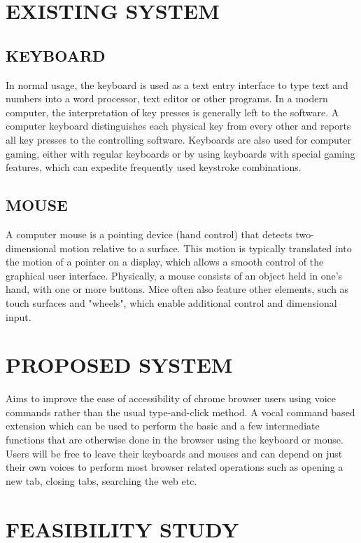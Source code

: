 \documentclass[12pt]{report} %
\begin{document}
\section{EXISTING SYSTEM}
\label{sec:EXISTING SYSTEM}

\subsection{KEYBOARD}
\label{subsec:KEYBOARD} 
In normal usage, the keyboard is used as a text entry interface to type text and numbers into a word processor, text editor or other programs. In a modern computer, the interpretation of key presses is generally left to the software. A computer keyboard distinguishes each physical key from every other and reports all key presses to the controlling software. Keyboards are also used for computer gaming, either with regular keyboards or by using keyboards with special gaming features, which can expedite frequently used keystroke combinations.

\subsection{MOUSE}
\label{subsec:MOUSE}
A computer mouse is a pointing device (hand control) that detects two-dimensional motion relative to a surface. This motion is typically translated into the motion of a pointer on a display, which allows a smooth control of the graphical user interface.
Physically, a mouse consists of an object held in one's hand, with one or more buttons. Mice often also feature other elements, such as touch surfaces and "wheels", which enable additional control and dimensional input.

\section{PROPOSED SYSTEM}
\label{sec:PROPOSED SYSTEM}
Aims to improve the ease of accessibility of chrome browser users using voice commands rather than the usual type-and-click method.
A vocal command based extension which can be used to perform the basic and a few intermediate functions that are otherwise done in the browser using the keyboard or mouse.
Users will be free to leave their keyboards and mouses and can depend on just their own voices to perform most browser related operations such as opening a new tab, closing tabs, searching the web etc. 

\section{FEASIBILITY STUDY}
\label{sec:FEASIBILITY STUDY}
\end{document}

